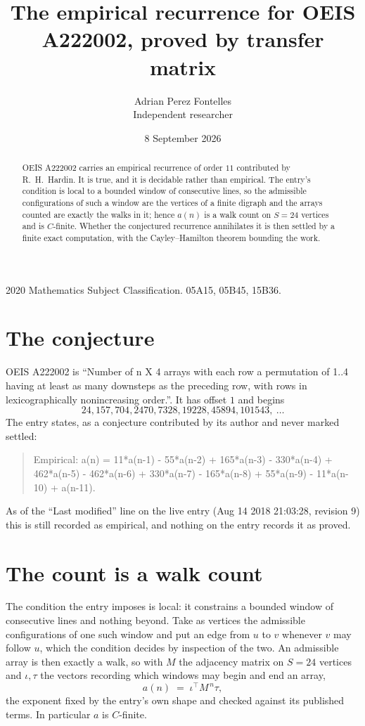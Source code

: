 \documentclass[11pt,a4paper]{article}
\title{The empirical recurrence for OEIS A222002, proved by transfer matrix}
\author{Adrian Perez Fontelles\\ \small Independent researcher}
\date{8 September 2026}
\theoremstyle{plain}
\theoremstyle{definition}
\begin{document}
\maketitle

\begin{abstract}
OEIS A222002 carries an empirical recurrence of order $11$ contributed by R.~H.~Hardin. It is
true, and it is decidable rather than empirical. The entry's condition is local to a bounded window of consecutive lines, so
the admissible configurations of such a window are the vertices of a finite digraph and the
arrays counted are exactly the walks in it; hence $a(n)$ is a walk count on $S=24$ vertices
and is $C$-finite. Whether the conjectured recurrence annihilates it is then settled by a
finite exact computation, with the Cayley--Hamilton theorem bounding the work.
\end{abstract}

\noindent\small 2020 Mathematics Subject Classification. 05A15, 05B45, 15B36.\normalsize

\section{The conjecture}

OEIS A222002 is ``Number of n X 4 arrays with each row a permutation of 1..4 having at least as many downsteps as the preceding row, with rows in lexicographically nonincreasing order.''. It has offset $1$ and begins
\[
24, 157, 704, 2470, 7328, 19228, 45894, 101543,\ \dots
\]
The entry states, as a conjecture contributed by its author and never marked settled:
\begin{quote}
Empirical: a(n) = 11*a(n-1) - 55*a(n-2) + 165*a(n-3) - 330*a(n-4) + 462*a(n-5) - 462*a(n-6) + 330*a(n-7) - 165*a(n-8) + 55*a(n-9) - 11*a(n-10) + a(n-11).
\end{quote}
As of the ``Last modified'' line on the live entry (Aug 14 2018 21:03:28, revision 9) this is still
recorded as empirical, and nothing on the entry records it as proved.

\section{The count is a walk count}

The condition the entry imposes is local: it constrains a bounded window of consecutive lines and nothing beyond. Take as
vertices the admissible configurations of one such window and put an edge from $u$ to $v$
whenever $v$ may follow $u$, which the condition decides by inspection of the two. An
admissible array is then exactly a walk, so with $M$ the adjacency matrix on $S=24$ vertices
and $\iota,\tau$ the vectors recording which windows may begin and end an array,
\[
a(n)\;=\;\iota^{\!\top}M^{\,n}\tau ,
\]
the exponent fixed by the entry's own shape and checked against its published terms. In
particular $a$ is $C$-finite.
\end{document}
